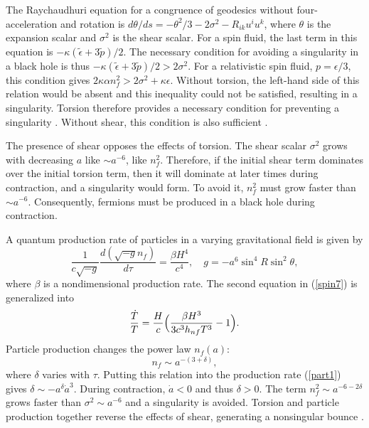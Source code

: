 \documentclass[prd,onecolumn,nofootinbib]{revtex4}
\begin{document}
The Raychaudhuri equation for a congruence of geodesics without four-acceleration and rotation is $d\theta/ds=-\theta^2/3-2\sigma^2-R_{ik}u^i u^k$, 
where $\theta$ is the expansion scalar and $\sigma^2$ is the shear scalar.
For a spin fluid, the last term in this equation is $-\kappa(\tilde{\epsilon}+3\tilde{p})/2$.
The necessary condition for avoiding a singularity in a black hole is thus $-\kappa(\tilde{\epsilon}+3\tilde{p})/2>2\sigma^2$.
For a relativistic spin fluid, $p=\epsilon/3$, this condition gives $2\kappa\alpha n_f^2>2\sigma^2+\kappa\epsilon$.
Without torsion, the left-hand side of this relation would be absent and this inequality could not be satisfied, resulting in a singularity.
Torsion therefore provides a necessary condition for preventing a singularity \cite{Hehl}.
Without shear, this condition is also sufficient \cite{iso}.

The presence of shear opposes the effects of torsion.
The shear scalar $\sigma^2$ grows with decreasing $a$ like $\sim a^{-6}$, like $n_f^2$.
Therefore, if the initial shear term dominates over the initial torsion term, then it will dominate at later times during contraction, and a singularity would form.
To avoid it, $n_f^2$ must grow faster than $\sim a^{-6}$.
Consequently, fermions must be produced in a black hole during contraction.

A quantum production rate of particles in a varying gravitational field is given by
\begin{equation}
    \frac{1}{c\sqrt{-g}}\frac{d(\sqrt{-g}n_f)}{d\tau}=\frac{\beta H^4}{c^4},\quad g=-a^6\sin^4R\sin^2\theta,
    \label{part1}
\end{equation}
where $\beta$ is a nondimensional production rate.
The second equation in (\ref{spin7}) is generalized into \cite{ApJ}
\begin{equation}
    \frac{\dot{T}}{T}=\frac{H}{c}\Bigl(\frac{\beta H^3}{3c^3 h_{nf}T^3}-1\Bigr).
    \label{part2}
\end{equation}
Particle production changes the power law $n_f(a)$:
\[
    n_f\sim a^{-(3+\delta)},
\]
where $\delta$ varies with $\tau$.
Putting this relation into the production rate (\ref{part1}) gives $\delta\sim -a^\delta\dot{a}^3$.
During contraction, $\dot{a}<0$ and thus $\delta>0$.
The term $n_f^2\sim a^{-6-2\delta}$ grows faster than $\sigma^2\sim a^{-6}$ and a singularity is avoided.
Torsion and particle production together reverse the effects of shear, generating a nonsingular bounce \cite{collapse}.\\
\end{document}

